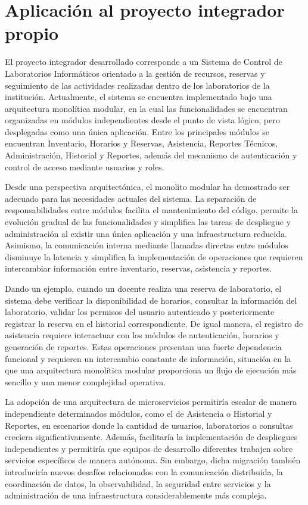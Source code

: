 \documentclass[10pt,conference]{IEEEtran}
\begin{document}
\section{Aplicación al proyecto integrador propio}
El proyecto integrador desarrollado corresponde a un Sistema de Control de Laboratorios Informáticos orientado a la gestión de recursos, reservas y seguimiento de las actividades realizadas dentro de los laboratorios de la institución. Actualmente, el sistema se encuentra implementado bajo una arquitectura monolítica modular, en la cual las funcionalidades se encuentran organizadas en módulos independientes desde el punto de vista lógico, pero desplegadas como una única aplicación. Entre los principales módulos se encuentran Inventario, Horarios y Reservas, Asistencia, Reportes Técnicos, Administración, Historial y Reportes, además del mecanismo de autenticación y control de acceso mediante usuarios y roles.

Desde una perspectiva arquitectónica, el monolito modular ha demostrado ser adecuado para las necesidades actuales del sistema. La separación de responsabilidades entre módulos facilita el mantenimiento del código, permite la evolución gradual de las funcionalidades y simplifica las tareas de despliegue y administración al existir una única aplicación y una infraestructura reducida. Asimismo, la comunicación interna mediante llamadas directas entre módulos disminuye la latencia y simplifica la implementación de operaciones que requieren intercambiar información entre inventario, reservas, asistencia y reportes.

Dando un ejemplo, cuando un docente realiza una reserva de laboratorio, el sistema debe verificar la disponibilidad de horarios, consultar la información del laboratorio, validar los permisos del usuario autenticado y posteriormente registrar la reserva en el historial correspondiente. De igual manera, el registro de asistencia requiere interactuar con los módulos de autenticación, horarios y generación de reportes. Estas operaciones presentan una fuerte dependencia funcional y requieren un intercambio constante de información, situación en la que una arquitectura monolítica modular proporciona un flujo de ejecución más sencillo y una menor complejidad operativa.

La adopción de una arquitectura de microservicios permitiría escalar de manera independiente determinados módulos, como el de Asistencia o Historial y Reportes, en escenarios donde la cantidad de usuarios, laboratorios o consultas creciera significativamente. Además, facilitaría la implementación de despliegues independientes y permitiría que equipos de desarrollo diferentes trabajen sobre servicios específicos de manera autónoma. Sin embargo, dicha migración también introduciría nuevos desafíos relacionados con la comunicación distribuida, la coordinación de datos, la observabilidad, la seguridad entre servicios y la administración de una infraestructura considerablemente más compleja.
\end{document}
